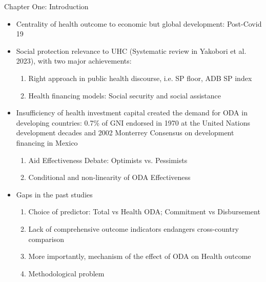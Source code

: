 \documentclass[aspectratio=169,handout, 10pt]{beamer}
\begin{document}
\begin{frame}{Chapter One: Introduction}
        \begin{itemize}
    \item Centrality of health outcome to economic but global development: Post-Covid 19
    \item Social protection relevance to UHC (Systematic review in Yakobori et al. 2023), with two major achievements:
    \begin{enumerate}[i]
        \item Right approach in public health discourse, i.e. SP floor, ADB SP index
        \item Health financing models: Social security and social assistance
    \end{enumerate}
    \item Insufficiency of health investment capital created the demand for ODA in developing countries: 0.7\% of GNI endorsed in 1970 at the United Nations development decades and 2002 Monterrey Consensus on development financing in Mexico
    \begin{enumerate}[i]
        \item Aid Effectiveness Debate: Optimists vs. Pessimists
        \item Conditional and non-linearity of ODA Effectiveness
    \end{enumerate}
    \item Gaps in the past studies
    \begin{enumerate}[i]
        \item Choice of predictor: Total vs Health ODA; Commitment vs Disbursement 
        \item Lack of comprehensive outcome indicators endangers cross-country comparison 
        \item More importantly, mechanism of the effect of ODA on Health outcome
        \item Methodological problem 
    \end{enumerate}
\end{itemize}
\end{frame}
\end{document}
